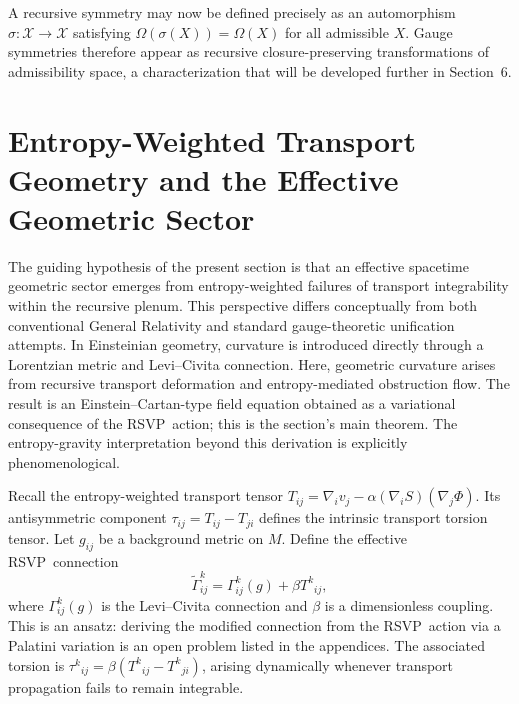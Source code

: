 \documentclass[12pt,a4paper]{article}
\newcommand{\RSVP}{\textrm{RSVP}}
\newcommand{\Field}{\mathcal{X}}
\begin{document}
A recursive symmetry may now be defined precisely as an automorphism
$\sigma:\Field\to\Field$ satisfying $\Omega(\sigma(X))=\Omega(X)$ for all
admissible $X$. Gauge symmetries therefore appear as recursive
closure-preserving transformations of admissibility space, a characterization
that will be developed further in Section~6.

\section{Entropy-Weighted Transport Geometry and the Effective Geometric Sector}

The guiding hypothesis of the present section is that an effective spacetime
geometric sector emerges from entropy-weighted failures of transport
integrability within the recursive plenum. This perspective differs conceptually
from both conventional General Relativity and standard gauge-theoretic
unification attempts. In Einsteinian geometry, curvature is introduced directly
through a Lorentzian metric and Levi--Civita connection. Here, geometric
curvature arises from recursive transport deformation and entropy-mediated
obstruction flow. The result is an Einstein--Cartan-type field equation obtained
as a variational consequence of the \RSVP\ action; this is the section's main
theorem. The entropy-gravity interpretation beyond this derivation is explicitly
phenomenological.

Recall the entropy-weighted transport tensor $T_{ij}=\nabla_iv_j-\alpha(\nabla_iS)(\nabla_j\Phi)$.
Its antisymmetric component $\tau_{ij}=T_{ij}-T_{ji}$ defines the intrinsic
transport torsion tensor. Let $g_{ij}$ be a background metric on $M$. Define
the effective \RSVP\ connection
\[
\widetilde{\Gamma}^k_{ij} = \Gamma^k_{ij}(g) + \beta T^k{}_{ij},
\]
where $\Gamma^k_{ij}(g)$ is the Levi--Civita connection and $\beta$ is a
dimensionless coupling. This is an ansatz: deriving the modified connection from
the \RSVP\ action via a Palatini variation is an open problem listed in the
appendices. The associated torsion is
$\tau^k{}_{ij}=\beta(T^k{}_{ij}-T^k{}_{ji})$,
arising dynamically whenever transport propagation fails to remain integrable.
\end{document}
